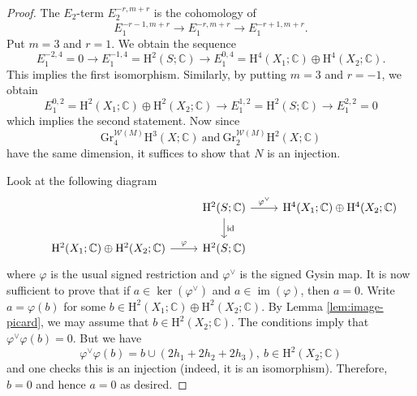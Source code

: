 \begin{proof}
The \(E_{2}\)-term \(E_{2}^{-r,m+r}\) is the cohomology of 
\begin{equation}
E_{1}^{-r-1,m+r} \to E_{1}^{-r,m+r}\to E_{1}^{-r+1,m+r}.
\end{equation}
Put \(m=3\) and \(r=1\). We obtain the sequence
\begin{equation}
E_{1}^{-2,4}=0 \to E_{1}^{-1,4}=\mathrm{H}^{2}(S;\mathbb{C})\to E_{1}^{0,4}=
\mathrm{H}^{4}(X_{1};\mathbb{C})\oplus\mathrm{H}^{4}(X_{2};\mathbb{C}).
\end{equation}
This implies the first isomorphism.
Similarly, by putting \(m=3\) and \(r=-1\), we obtain
\begin{equation}
E_{1}^{0,2}=
\mathrm{H}^{2}(X_{1};\mathbb{C})\oplus\mathrm{H}^{2}(X_{2};\mathbb{C}) 
\to E_{1}^{1,2}=\mathrm{H}^{2}(S;\mathbb{C})\to E_{1}^{2,2}=0
\end{equation}
which implies the second statement.
Now since 
\begin{equation}
\mathrm{Gr}_{4}^{\mathcal{W}(M)}
\mathrm{H}^{3}(X;\mathbb{C})~
\mbox{and}~\mathrm{Gr}_{2}^{\mathcal{W}(M)}
\mathrm{H}^{2}(X;\mathbb{C})
\end{equation}
have the same dimension, it suffices to show that 
\(N\) is an injection. 

Look at the following diagram
\begin{equation}
\begin{tikzcd}
& &\mathrm{H}^{2}(S;\mathbb{C})\ar[r,"\varphi^{\vee}"]\ar[d,"\mathrm{id}"]
&\mathrm{H}^{4}(X_{1};\mathbb{C})\oplus\mathrm{H}^{4}(X_{2};\mathbb{C})\\
&\mathrm{H}^{2}(X_{1};\mathbb{C})\oplus\mathrm{H}^{2}(X_{2};\mathbb{C})\ar[r,"\varphi"]
&\mathrm{H}^{2}(S;\mathbb{C}) &
\end{tikzcd}
\end{equation}
where \(\varphi\) is the usual signed restriction
and \(\varphi^{\vee}\) is the signed Gysin map. It is now sufficient to prove that
if \(a\in\operatorname{ker}(\varphi^{\vee})\) and \(a\in\operatorname{im}(\varphi)\), 
then \(a=0\). Write \(a=\varphi(b)\) for some \(b\in 
\mathrm{H}^{2}(X_{1};\mathbb{C})\oplus\mathrm{H}^{2}(X_{2};\mathbb{C})\).
By Lemma \ref{lem:image-picard}, we may assume that \(b\in \mathrm{H}^{2}(X_{2};\mathbb{C})\).
The conditions imply that \(\varphi^{\vee}\varphi(b)=0\).
But we have
\begin{equation}
\varphi^{\vee}\varphi(b) = b\cup (2h_{1}+2h_{2}+2h_{3}),~b\in \mathrm{H}^{2}(X_{2};\mathbb{C})
\end{equation}
and one checks this is an injection (indeed, it is an isomorphism). Therefore, \(b=0\)
and hence \(a=0\) as desired.
\end{proof}

